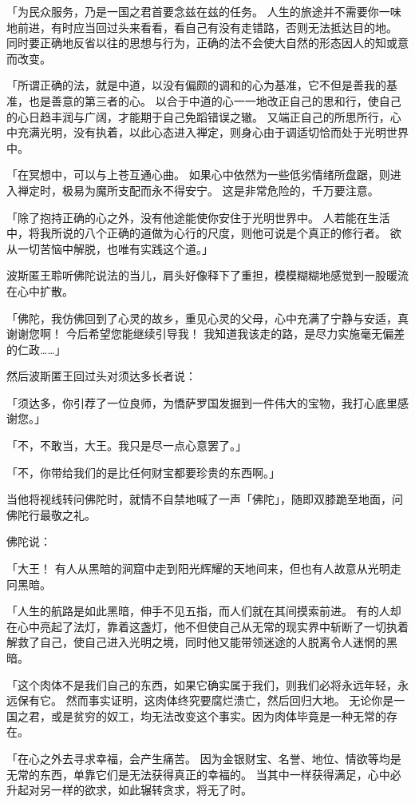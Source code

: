 \documentclass[twoside,openany]{book}
\begin{document}
「为民众服务，乃是一国之君首要念兹在兹的任务。
人生的旅途并不需要你一味地前进，有时应当回过头来看看，看自己有没有走错路，否则无法抵达目的地。
同时要正确地反省以往的思想与行为，正确的法不会使大自然的形态因人的知或意而改变。

「所谓正确的法，就是中道，以没有偏颇的调和的心为基准，它不但是善我的基准，也是善意的第三者的心。
以合于中道的心一一地改正自己的思和行，使自己的心日趋丰润与广阔，才能期于自己免蹈错误之辙。
又端正自己的所思所行，心中充满光明，没有执着，以此心态进入禅定，则身心由于调适切恰而处于光明世界中。

「在冥想中，可以与上苍互通心曲。
如果心中依然为一些低劣情绪所盘踞，则进入禅定时，极易为魔所支配而永不得安宁。
这是非常危险的，千万要注意。

「除了抱持正确的心之外，没有他途能使你安住于光明世界中。
人若能在生活中，将我所说的八个正确的道做为心行的尺度，则他可说是个真正的修行者。
欲从一切苦恼中解脱，也唯有实践这个道。」

波斯匿王聆听佛陀说法的当儿，肩头好像释下了重担，模模糊糊地感觉到一股暖流在心中扩散。

「佛陀，我仿佛回到了心灵的故乡，重见心灵的父母，心中充满了宁静与安适，真谢谢您啊！
今后希望您能继续引导我！
我知道我该走的路，是尽力实施毫无偏差的仁政……」

然后波斯匿王回过头对须达多长者说：

「须达多，你引荐了一位良师，为憍萨罗国发掘到一件伟大的宝物，我打心底里感谢您。」

「不，不敢当，大王。我只是尽一点心意罢了。」

「不，你带给我们的是比任何财宝都要珍贵的东西啊。」

当他将视线转问佛陀时，就情不自禁地喊了一声「佛陀」，随即双膝跪至地面，问佛陀行最敬之礼。

佛陀说：

「大王！
有人从黑暗的涧窟中走到阳光辉耀的天地间来，但也有人故意从光明走冋黑暗。

「人生的航路是如此黑暗，伸手不见五指，而人们就在其间摸索前进。
有的人却在心中亮起了法灯，靠着这盏灯，他不但使自己从无常的现实界中斩断了一切执着解救了自己，使自己进入光明之境，同时他又能带领迷途的人脱离令人迷惘的黑暗。

「这个肉体不是我们自己的东西，如果它确实属于我们，则我们必将永远年轻，永远保有它。
然而事实证明，这肉体终究要腐烂溃亡，然后回归大地。
无论你是一国之君，或是贫穷的奴工，均无法改变这个事实。因为肉体毕竟是一种无常的存在。

「在心之外去寻求幸福，会产生痛苦。
因为金银财宝、名誉、地位、情欲等均是无常的东西，单靠它们是无法获得真正的幸福的。
当其中一样获得满足，心中必升起对另一样的欲求，如此辗转贪求，将无了时。
\end{document}
